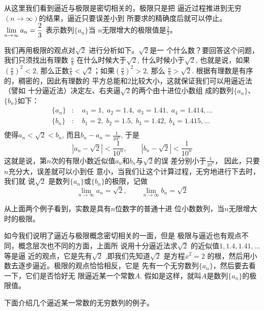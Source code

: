 从这里我们看到逼近与极限是密切相关的，极限只是把
逼近过程推进到无穷$(n\to\infty)$的结果，逼近只要误差小到
所要求的精确度后就可以停止。$\displaystyle\lim_{n\to\infty}a_n=\dfrac{2}{3}$
表示数列$\{a_n\}$当
$n$无限增大的极限值是$\frac{2}{3}$。

我们再用极限的观点对$\sqrt{2}$ 进行分析如下。$\sqrt{2}$是一
个什么数？要回答这个问题，我们只须找出有理数
$\frac{a}{b}$
在什么时候大于$\sqrt{2}$, 什么时候小于$\sqrt{2}$, 也就是说，如果
$\left(\frac{a}{b}\right)^2<2$, 那么正数$\frac{a}{b}<\sqrt{2}$；如果$\left(\frac{a}{b}\right)^2>2$, 那么
$\frac{a}{b}>\sqrt{2}$. 根据有理数是有序的，稠密的，因此有理数的
平方总能和2比较大小，这就保证我们可以用逼近法（譬如
十分逼近法）决定左、右夹逼$\sqrt{2}$的两个由十进位小数组
成的数列$\{a_n\}$、$\{b_n\}$如下：
\[\begin{split}
    \{a_n\}&:\quad a_1=1,\; a_2=1.4,\; a_3=1.41,\; a_4=1.414,\ldots\\
    \{b_n\}&:\quad b_1=2,\; b_2=1.5,\; b_3=1.42,\; b_4=1.415,\ldots\\
\end{split}\]
使得$a_n<\sqrt{2}<b_n$, 而且$b_n-a_n=\frac{1}{10^n}$,
于是
\[|a_n-\sqrt{2}|<\frac{1}{10^n},\qquad |b_n-\sqrt{2}|<\frac{1}{10^n} \]
这就是说，第$n$次的有限小数近似值$a_n$和$b_n$与$\sqrt{2}$的误
差分别小于$\frac{1}{10^n}$，
因此，只要$n$充分大，误差就可以小到任
意小，当我们让这个计算过程，无穷地进行下去时，我们就
说$\sqrt{2}$ 是数列$\{a_n\}$或$\{b_n\}$的极限，记做
\[\lim_{n\to\infty}a_n=\sqrt{2},\qquad \lim_{n\to\infty}b_n=\sqrt{2}\]

从上面两个例子看到，实数是具有$n$位数字的普通十进
位小数数列，当$n$无限增大时的极限。

如今我们说明了逼近与极限概念密切相关的一面，但是
极限与逼近也有观点不同，概念层次也不同的方面，上面所
说用十分逼近法求$\sqrt{2}$ 的近似值$1,1.4,1.41,\ldots$等是逼
近的观点，它是先有$\sqrt{2}$ ,即我们先知道$\sqrt{2}$  是方程$x^2=2$
的根，然后用小数去逐步逼近。极限的观点恰恰相反，它是
先有一个无穷数列$\{a_n\}$，然后要去看一下，它们是否恰好无
限逼近某一个常数$A$. 假如是这样，就叫$A$是数列$\{a_n\}$的极
限值。

下面介绍几个逼近某一常数的无穷数列的例子。

